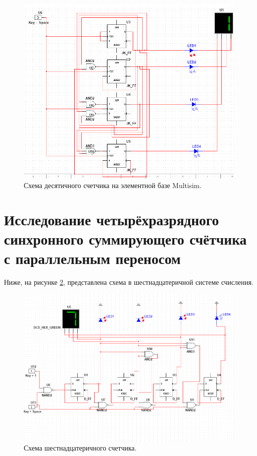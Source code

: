 \begin{figure}[ht]
    \centering
    \includegraphics[width=\linewidth]{img/sc5.png}
    \caption{Схема десятичного счетчика на элементной базе Multisim.}
    \label{sc5}
\end{figure}

\section{Исследование четырёхразрядного синхронного суммирующего счётчика с параллельным переносом}

Ниже, на рисунке \ref{sc6}, представлена схема в шестнадцатеричной системе счисления.

\begin{figure}[ht]
    \centering
    \includegraphics[width=\linewidth]{img/sc6.png}
    \caption{Схема шестнадцатеричного счетчика.}
    \label{sc6}
\end{figure}

